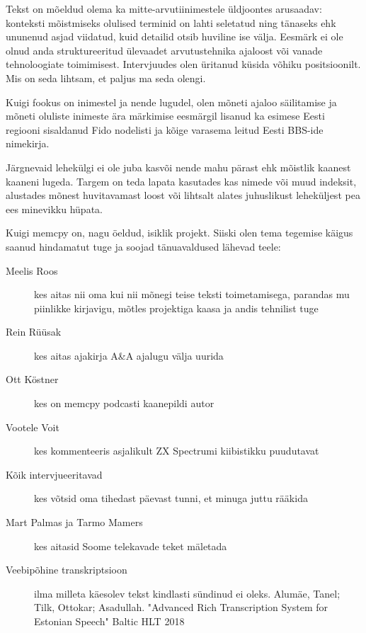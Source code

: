 Tekst on mõeldud olema ka mitte-arvutiinimestele üldjoontes arusaadav: 
konteksti mõistmiseks olulised terminid on lahti seletatud ning tänaseks ehk 
ununenud asjad viidatud, kuid detailid otsib huviline ise välja. Eesmärk ei ole 
olnud anda struktureeritud ülevaadet arvutustehnika ajaloost või vanade 
tehnoloogiate toimimisest. Intervjuudes olen üritanud küsida võhiku 
positsioonilt. Mis on seda lihtsam, et paljus ma seda olengi.

Kuigi fookus on inimestel ja nende lugudel, olen mõneti ajaloo säilitamise ja 
mõneti oluliste inimeste ära märkimise eesmärgil lisanud ka esimese Eesti regiooni
sisaldanud Fido nodelisti ja kõige varasema leitud Eesti BBS-ide nimekirja.

Järgnevaid lehekülgi ei ole juba kasvõi nende mahu pärast ehk mõistlik kaanest 
kaaneni lugeda. Targem on teda lapata kasutades kas nimede või muud indeksit, 
alustades mõnest huvitavamast loost või lihtsalt alates juhuslikust leheküljest 
pea ees minevikku hüpata.

Kuigi memcpy on, nagu öeldud, isiklik projekt. Siiski olen tema tegemise käigus 
saanud hindamatut tuge ja soojad tänuavaldused lähevad teele:

\begin{description}
	\item[Meelis Roos] kes aitas nii oma kui nii 
mõnegi teise teksti toimetamisega, parandas mu piinlikke kirjavigu, mõtles 
projektiga kaasa ja andis tehnilist tuge
	\item[Rein Rüüsak] kes aitas ajakirja A\&A 
ajalugu välja uurida
	\item[Ott Köstner] kes on memcpy podcasti 
kaanepildi autor
	\item[Vootele Voit] kes kommenteeris 
asjalikult ZX Spectrumi kiibistikku puudutavat
	\item[Kõik intervjueeritavad] kes võtsid oma tihedast päevast tunni, et 
minuga juttu rääkida
	\item[Mart Palmas ja Tarmo Mamers] kes aitasid Soome telekavade teket mäletada 
	\item[Veebipõhine transkriptsioon] ilma milleta käesolev tekst 
kindlasti sündinud ei oleks. Alumäe, Tanel; Tilk, Ottokar; Asadullah. "Advanced 
Rich Transcription System for Estonian Speech" Baltic HLT 2018
\end{description}
